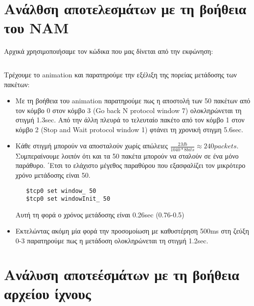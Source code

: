 \documentclass[a4paper,9pt]{article}
\begin{document}
\def\thesection {\Roman{section}.}



\section*{Aνάλθση αποτελεσμάτων με τη βοήθεια του NAM}
Αρχικά χρησιμοποιήσαμε τον κώδικα που μας δίνεται από την εκφώνηση:

\inputminted[fontsize=\footnotesize]{tcl}{files/ex4_1.tcl}

Τρέχουμε το animation και παρατηρούμε την εξέλιξη της πορείας μετάδοσης των
πακέτων:
\begin{itemize}
    \item Με τη βοήθεια του animation παρατηρούμε πως η αποστολή των 50
    πακέτων από τον κόμβο 0 στον κόμβο 3 (Go back N protocol window 7) ολοκληρώνεται τη
    στιγμή 1.3sec. Από την άλλη πλευρά το τελευταίο πακέτο από τον κόμβο 1
    στον κόμβο 2 (Stop and Wait protocol window 1) φτάνει τη χρονική στιγμη
    5.6sec.
    \item Κάθε στιγμή μπορούν να αποσταλούν χωρίς απώλειες
    $\frac{2Mb}{1040*8bits}\approx240packets$.  Συμπεραίνουμε λοιπόν ότι και
    τα 50 πακέτα μπορούν να σταλούν σε ένα μόνο παράθυρο. ΄Ετσι το ελάχιστο μέγεθος παραθύρου που εξασφαλίζει τον
   μικρότερο χρόνο μετάδοσης είναι 50.
   \begin{verbatim}
   $tcp0 set window_ 50
   $tcp0 set windowInit_ 50
   \end{verbatim}
   Αυτή τη φορά ο χρόνος μετάδοσης είναι 0.26sec (0.76-0.5)
   \item Εκτελώντας ακόμη μία φορά την προσομοίωση με καθυστέρηση 500ms στη
       ζεύξη 0-3 παρατηρούμε πως η μετάδοση ολοκληρώνεται τη στιγμή 1.2sec.
\end{itemize}

\section*{Ανάλυση αποτεέσμάτων με τη βοήθεια αρχείου ίχνους}


\inputminted[fontsize=\footnotesize]{awk}{files/script_1.awk}
\end{document}

